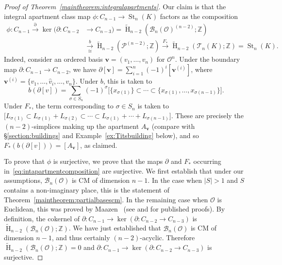 \documentclass[11 pt]{article}
\theoremstyle{plain}
\theoremstyle{definition}
\numberwithin{equation}{section}
\newcommand\Z{\ensuremath{\mathbb{Z}}}
\DeclareMathOperator{\HH}{H}
\renewcommand{\O}{\mathcal{O}}
\newcommand\PartialBases{\ensuremath{\mathcal{B}}}
\newcommand{\PB}{\PartialBases}
\newcommand\Tits{\ensuremath{\mathcal{T}}}
\DeclareMathOperator{\St}{St}
\newcommand\vv{\mathbf{v}}
\newcommand\Poset{\ensuremath{\mathcal{P}}}
\newcommand\PP{\Poset^{(n-2)}}
\newcommand\abs[1]{\left\lvert#1\right\rvert}
\newcommand\iso{\cong}
\begin{document}
\begin{proof}[{Proof of Theorem~\ref{maintheorem:integralapartments}}]
Our claim is that the integral apartment class map $\phi\colon C_{n-1}\to \St_n(K)$ factors as the composition
\begin{equation}
\label{eq:intapartmentcomposition}
\begin{aligned}
\phi\colon C_{n-1}\xrightarrow{\partial} \ker(\partial\colon C_{n-2}&\to C_{n-3})= \widetilde{\HH}_{n-2}(\PB_n(\O)^{(n-2)};\Z)\\
&\xrightarrow[\iso]{b} \widetilde{\HH}_{n-2}(\PP;\Z)\xrightarrow{F_{\ast}} \widetilde{\HH}_{n-2}(\Tits_n(K);\Z)=\St_n(K).
\end{aligned}
\end{equation}
Indeed, consider an ordered basis $\vv=(v_1,\ldots,v_n)$ for $\O^n$. Under the boundary map 
$\partial\colon C_{n-1}\to C_{n-2}$, we have $\partial[\vv]=\sum_{i=1}^n (-1)^i [\vv^{(i)}]$, where $\vv^{(i)}=\{v_1,\ldots,\widehat{v}_i,\ldots,v_n\}$. Under $b$, this is taken to \[b(\partial [v])=\sum_{\sigma\in S_n}(-1)^\sigma \big[\{x_{\sigma(1)}\}\subset \cdots\subset \{x_{\sigma(1)},\ldots,x_{\sigma(n-1)}\}\big].\] 
Under $F_{\ast}$, the term corresponding to $\sigma\in S_n$ is taken to $\big[L_{\sigma(1)}\subset L_{\sigma(1)}+L_{\sigma(2)}\subset \cdots\subset L_{\sigma(1)}+\cdots + L_{\sigma(n-1)}\big]$. These are precisely the $(n-2)$-simplices making up the apartment $A_{\vv}$ (compare with \S\ref{section:buildings}  and Example~\ref{ex:Titsbuilding} below), and so $F_{\ast}(b(\partial[v]))=[A_{\vv}]$, as claimed.

To prove that $\phi$ is surjective, we prove that the maps $\partial$ and $F_{\ast}$ occurring in~\eqref{eq:intapartmentcomposition} are surjective. We first establish that under our assumptions, $\PB_n(\O)$ is CM of dimension $n-1$. In the case when $\abs{S}>1$ and $S$ contains a non-imaginary place, this is the statement of Theorem~\ref{maintheorem:partialbasescm}. In the remaining case when $\O$ is Euclidean, this was proved by Maazen~\cite{MaazenThesis} (see
\cite[Appendix]{LooijengaVanDerKallen} and \cite[Proof of Theorem B]{DayPutmanComplex}
for published proofs). 
By definition, the cokernel of $\partial\colon C_{n-1}\to \ker(\partial\colon C_{n-2}\to C_{n-3})$ is $\widetilde{\HH}_{n-2}(\PB_n(\O);\Z)$. We have just established that $\PB_n(\O)$ is CM of dimension $n-1$, and thus certainly $(n-2)$-acyclic. Therefore $\widetilde{\HH}_{n-2}(\PB_n(\O);\Z)=0$ and $\partial\colon C_{n-1}\to \ker(\partial\colon C_{n-2}\to C_{n-3})$ is surjective.


\end{proof}
\end{document}
